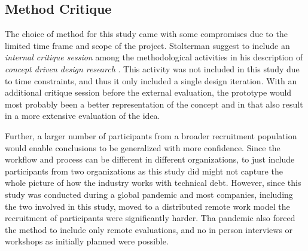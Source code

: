 \subsection{Method Critique}
The choice of method for this study came with some compromises due to the limited time frame and scope of the project.
Stolterman suggest to include an \textit{internal critique session} among the methodological activities in his description of \textit{concept driven design research} \cite{stolterman_concept-driven_2010}.
This activity was not included in this study due to time constraints, and thus it only included a single design iteration.
With an additional critique session before the external evaluation, the prototype would most probably been a better representation of the concept and in that also result in a more extensive evaluation of the idea.

Further, a larger number of participants from a broader recruitment population would enable conclusions to be generalized with more confidence.
Since the workflow and process can be different in different organizations, to just include participants from two organizations as this study did might not capture the whole picture of how the industry works with technical debt.
However, since this study was conducted during a global pandemic and most companies, including the two involved in this study, moved to a distributed remote work model the recruitment of participants were significantly harder.
Tha pandemic also forced the method to include only remote evaluations, and no in person interviews or workshops as initially planned were possible.